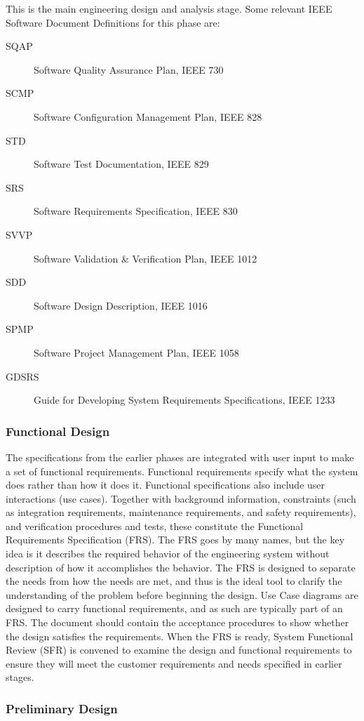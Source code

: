 This is the main engineering design and analysis stage.  Some relevant IEEE Software Document Definitions for this phase are:
\begin{description}
\item[SQAP] Software Quality Assurance Plan, IEEE 730
\item[SCMP] Software Configuration Management Plan, IEEE 828
\item[STD] Software Test Documentation, IEEE 829
\item[SRS] Software Requirements Specification, IEEE 830
\item[SVVP] Software Validation \& Verification Plan, IEEE 1012
\item[SDD] Software Design Description, IEEE 1016
\item[SPMP] Software Project Management Plan, IEEE 1058
\item[GDSRS] Guide for Developing System Requirements Specifications, IEEE 1233
\end{description}


\subsubsection{Functional Design}
The specifications from the earlier phases are integrated with user input to make a set of functional requirements. Functional requirements specify what the system does rather than how it does it.  Functional specifications also include user interactions (use cases).  Together with background information, constraints (such as integration requirements, maintenance requirements, and safety requirements), and verification procedures and tests, these constitute the Functional Requirements Specification (FRS).  The FRS goes by many names, but the key idea is it describes the required behavior of the engineering system without description of how it accomplishes the behavior.  The FRS is designed to separate the needs from how the needs are met, and thus is the ideal tool to clarify the understanding of the problem before beginning the design.  Use Case diagrams are designed to carry functional requirements, and as such are typically part of an FRS.  The document should contain the acceptance procedures to show whether the design satisfies the requirements. When the FRS is ready, System Functional Review (SFR) is convened to examine the design and functional requirements to ensure they will meet the customer requirements and needs specified in earlier stages.

\subsubsection{Preliminary Design}

